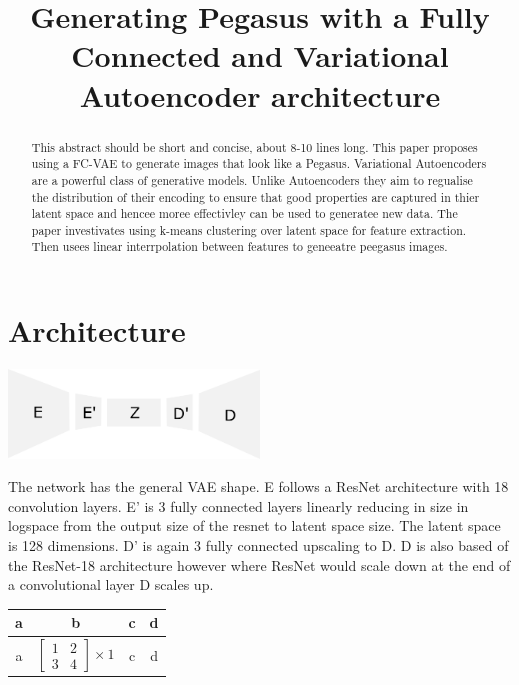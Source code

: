 \documentclass{article}
\title{Generating Pegasus with a Fully Connected and Variational Autoencoder architecture}
\begin{document}
\maketitle
\begin{abstract}
    This abstract should be short and concise, about 8-10 lines long.
    This paper proposes using a FC-VAE to generate images that look like a Pegasus.  Variational Autoencoders are a powerful class of generative models. Unlike Autoencoders they aim to regualise the distribution of their encoding to ensure that good properties are captured in thier latent space and hencee moree effectivley can be used to generatee new data. The paper investivates using k-means clustering over latent space for feature extraction. Then usees linear interrpolation between features to geneeatre peegasus images.
\end{abstract}

\section{Architecture}
\begin{center}
    \includegraphics[width=0.5\textwidth]{figures/Encoder.png}
\end{center}
The network has the general VAE shape. E follows a ResNet \cite{ResNet} architecture with 18 convolution layers. E' is 3 fully connected layers linearly reducing in size in logspace from the output size of the resnet to latent space size. The latent space is 128 dimensions. D' is again 3 fully connected upscaling to D. D is also based of the ResNet-18 architecture however where ResNet would scale down at the end of a convolutional layer D scales up.



\begin{tabular}{c|c|c|c}
    a&b&c&d\\
    \hline
    a & $\begin{bmatrix} 1 & 2 \\ 3 & 4 \end{bmatrix} \times 1$&c&d\\
\end{tabular}
\end{document}
